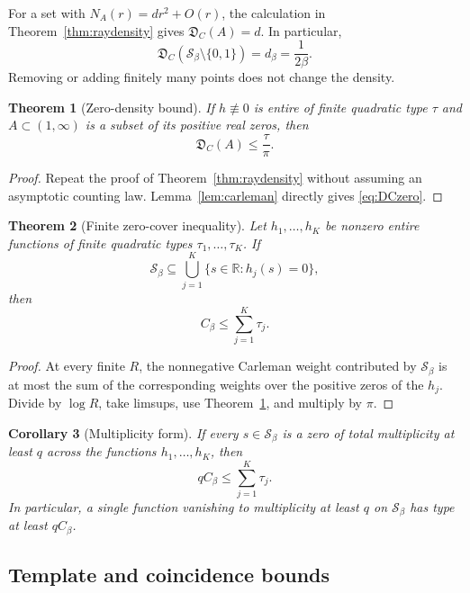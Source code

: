 \documentclass[11pt,oneside]{article}
\newtheorem{theorem}{Theorem}[section]
\newtheorem{corollary}[theorem]{Corollary}
\theoremstyle{definition}
\theoremstyle{remark}
\newcommand{\R}{\mathbb R}
\newcommand{\Sbeta}{\mathcal S_\beta}
\newcommand{\DC}{\mathfrak D_{\!C}}
\newcommand{\Cbeta}{C_\beta}
\begin{document}
For a set with $N_A(r)=d r^2+O(r)$, the calculation in
Theorem~\ref{thm:raydensity} gives $\DC(A)=d$.  In particular,
\begin{equation}
 \DC(\Sbeta\setminus\{0,1\})=d_\beta=\frac1{2\beta}.
 \label{eq:DCS}
\end{equation}
Removing or adding finitely many points does not change the density.

\begin{theorem}[Zero-density bound]
\label{thm:DCzero}
If $h\not\equiv0$ is entire of finite quadratic type $\tau$ and $A\subset(1,\infty)$ is a
subset of its positive real zeros, then
\begin{equation}
 \DC(A)\le\frac{\tau}{\pi}.
 \label{eq:DCzero}
\end{equation}
\end{theorem}

\begin{proof}
Repeat the proof of Theorem~\ref{thm:raydensity} without assuming an asymptotic counting
law.  Lemma~\ref{lem:carleman} directly gives \eqref{eq:DCzero}.
\end{proof}

\begin{theorem}[Finite zero-cover inequality]
\label{thm:zerocover}
Let $h_1,\dots,h_K$ be nonzero entire functions of finite quadratic types
$\tau_1,\dots,\tau_K$.  If
\[
 \Sbeta\subseteq\bigcup_{j=1}^{K}\{s\in\R:h_j(s)=0\},
\]
then
\begin{equation}
 \boxed{\Cbeta\le\sum_{j=1}^{K}\tau_j.}
 \label{eq:coverineq}
\end{equation}
\end{theorem}

\begin{proof}
At every finite $R$, the nonnegative Carleman weight contributed by $\Sbeta$ is at most the
sum of the corresponding weights over the positive zeros of the $h_j$.  Divide by
$\log R$, take limsups, use Theorem~\ref{thm:DCzero}, and multiply by $\pi$.
\end{proof}

\begin{corollary}[Multiplicity form]
If every $s\in\Sbeta$ is a zero of total multiplicity at least $q$ across the functions
$h_1,\dots,h_K$, then
\[
 q\Cbeta\le\sum_{j=1}^{K}\tau_j.
\]
In particular, a single function vanishing to multiplicity at least $q$ on $\Sbeta$ has
type at least $q\Cbeta$.
\end{corollary}

\subsection{Template and coincidence bounds}
\end{document}
